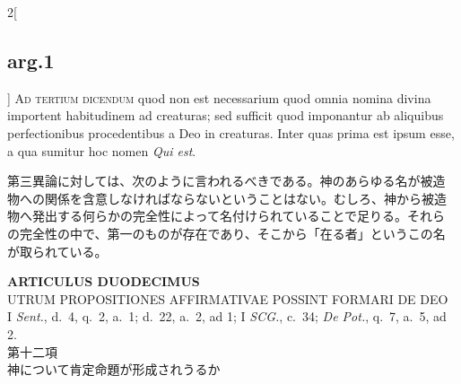 \documentclass[paper=a4paper,fontsize=10pt,jafontsize=9pt,titlepage]{jlreq}
\begin{document}
\begin{paracol}{2}[\subsection{arg.1}]
{\scshape Ad tertium dicendum} quod non est necessarium quod omnia
nomina divina importent habitudinem ad creaturas; sed sufficit quod
imponantur ab aliquibus perfectionibus procedentibus a Deo in
creaturas. Inter quas prima est ipsum esse, a qua sumitur hoc nomen
{\itshape Qui est}.

\switchcolumn

第三異論に対しては、次のように言われるべきである。神のあらゆる名が被造
物への関係を含意しなければならないということはない。むしろ、神から被造
物へ発出する何らかの完全性によって名付けられていることで足りる。それら
の完全性の中で、第一のものが存在であり、そこから「在る者」というこの名
が取られている。

\end{paracol}

\newpage
{}

\begin{center}
{\Large {\bfseries ARTICULUS DUODECIMUS}}\\
{\large UTRUM PROPOSITIONES AFFIRMATIVAE POSSINT FORMARI DE DEO}\\
{\footnotesize I {\itshape Sent.}, d.~4, q.~2, a.~1; d.~22, a.~2, ad 1;
I {\itshape SCG.}, c.~34; {\itshape De Pot.}, q.~7, a.~5, ad 2.}\\
{\Large 第十二項\\神について肯定命題が形成されうるか}
\end{center}

{}
\setcounter{section}{12}
\setcounter{subsection}{0}
\end{document}
